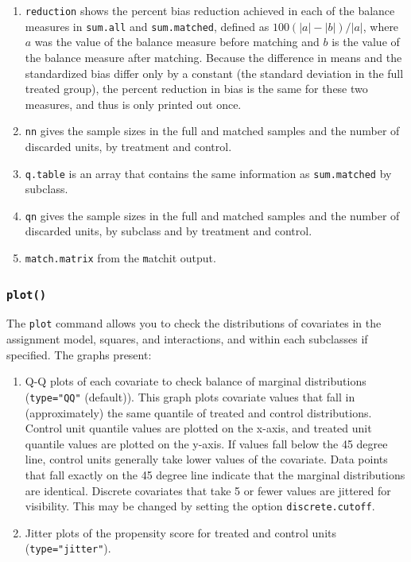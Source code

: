 \documentclass[oneside,letterpaper,titlepage]{article}
\begin{document}
\begin{enumerate}
\item \texttt{reduction} shows the percent bias reduction achieved in
  each of the balance measures in \texttt{sum.all} and
  \texttt{sum.matched}, defined as $100(|a|-|b|)/|a|$, where $a$ was
  the value of the balance measure before matching and $b$ is the
  value of the balance measure after matching.  Because the difference in means and the standardized bias
  differ only by a constant (the standard deviation in the full treated group), the percent reduction in bias
  is the same for these two measures, and thus is only printed out once.

\item \texttt{nn} gives the sample sizes in the full and matched
  samples and the number of discarded units, by treatment and control.
  
\item \texttt{q.table} is an array that contains the same information
  as \texttt{sum.matched} by subclass.
  
\item \texttt{qn} gives the sample sizes in the full and matched
  samples and the number of discarded units, by subclass and by
  treatment and control.
\item \texttt{match.matrix} from the {\texttt matchit} output.
\end{enumerate}

\subsubsection{{\tt plot()}}

The \texttt{plot} command allows you to check the distributions of
covariates in the assignment model, squares, and interactions, and
within each subclasses if specified.  The graphs present:
\begin{enumerate}
\item Q-Q plots of each covariate to check balance of marginal
  distributions (\texttt{type="QQ"} (default)).  This graph plots
  covariate values that fall in (approximately) the same quantile of
  treated and control distributions.  Control unit quantile values are
  plotted on the x-axis, and treated unit quantile values are plotted
  on the y-axis.  If values fall below the 45 degree line, control
  units generally take lower values of the covariate.  Data points
  that fall exactly on the 45 degree line indicate that the marginal
  distributions are identical.  Discrete covariates that take 5 or
  fewer values are jittered for visibility.  This may be changed by
  setting the option \texttt{discrete.cutoff}.
\item Jitter plots of the propensity score for treated and control
  units (\texttt{type="jitter"}).
\end{enumerate}
\end{document}
